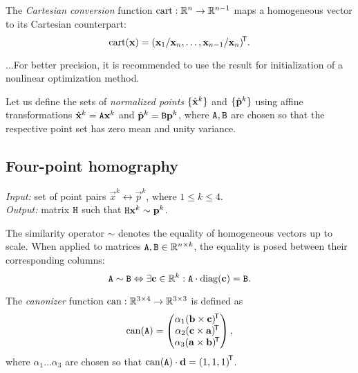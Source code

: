 \begin{definition}
The \textit{Cartesian conversion} function $\mathrm{cart}: \mathbb{R}^n \to \mathbb{R}^{n - 1}$ maps a homogeneous vector to its Cartesian counterpart:
$$
\mathrm{cart}(\mathbf{x}) = (\mathbf{x}_1 / \mathbf{x}_n, \dots, \mathbf{x}_{n - 1} / \mathbf{x}_n)^{\!\mathsf{T}}.
$$
\end{definition}

...For better precision, it is recommended to use the result for initialization of a nonlinear optimization method.

Let us define the sets of \textit{normalized points} $\{ \hat{\mathbf{x}}^k \}$ and $\{ \hat{\mathbf{p}}^k \}$ using affine transformations $\hat{\mathbf{x}}^k = \mathtt{A} \mathbf{x}^k$ and $\hat{\mathbf{p}}^k = \mathtt{B} \mathbf{p}^k$, where $\mathtt{A}, \mathtt{B}$ are chosen so that the respective point set has zero mean and unity variance.


\subsection{Four-point homography}
\label{s:algo-homo}
\textit{Input:} set of point pairs $\vec x^k \leftrightarrow \vec p^k$, where $1 \leq k \leq 4$.\\
\textit{Output:} matrix $\mathtt{H}$ such that $\mathtt{H} \mathbf{x}^k \sim \mathbf{p}^k$.\\

\begin{definition}
The similarity operator $\sim$ denotes the equality of homogeneous vectors up to scale.
When applied to matrices $\mathtt{A}, \mathtt{B} \in \mathbb{R}^{n \times k}$, the equality is posed between their corresponding columns:
$$
\mathtt{A} \sim \mathtt{B} \Leftrightarrow \exists \mathbf{c} \in \mathbb{R}^k : \mathtt{A} \cdot \mathrm{diag}(\mathbf{c}) = \mathtt{B}.
$$
\end{definition}

\begin{definition}
The \textit{canonizer} function $\mathrm{can}: \mathbb{R}^{3\times 4} \to \mathbb{R}^{3\times 3}$ is defined as
$$\mathrm{can}(\mathtt{A}) = \begin{pmatrix}
 \alpha_1 (\mathbf{b} \times \mathbf{c}) ^{\!\mathsf{T}} \\
 \alpha_2 (\mathbf{c} \times \mathbf{a}) ^{\!\mathsf{T}} \\
 \alpha_3 (\mathbf{a} \times \mathbf{b}) ^{\!\mathsf{T}} \\
 \end{pmatrix},
$$
where $\alpha_1 \dots \alpha_3$ are chosen so that $\mathrm{can}(\mathtt{A}) \cdot \mathbf{d} = \left( 1, 1, 1 \right)^{\!\mathsf{T}}$.
\end{definition}

